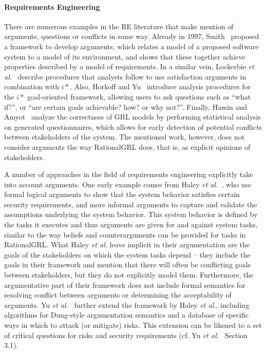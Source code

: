 \paragraph{Requirements Engineering} 
There are numerous examples in the RE literature that make mention of arguments, questions or conflicts in some way. Already in 1997, Smith~\cite{Smith:1997:CRF:2737426.2737493} proposed a framework to develop arguments, which relates a model of a proposed software system to a model of its environment, and shows that these together achieve properties described by a model of requirements. In a similar vein, Lockerbie \emph{et al.}~\cite{lockerbie2012exploring} describe procedures that analysts follow to use satisfaction arguments in combination with $i*$. Also, Horkoff and Yu~\cite{horkoff2016interactive} introduce analysis procedures for the $i*$ goal-oriented framework, allowing users to ask questions such as ``what if?'', or ``are certain goals achievable? how? or why not?''. Finally, Hassin and Amyot~\cite{hassine2016questionnaire} analyze the correctness of GRL models by performing statistical analysis on generated questionnaires, which allows for early detection of potential conflicts between stakeholders of the system. The mentioned work, however, does not consider arguments the way RationalGRL does, that is, as explicit opinions of stakeholders. 

A number of approaches in the field of requirements engineering explicitly take into account arguments. One early example comes from Haley \emph{et al.}~\cite{haley2008security}, who use formal logical arguments to show that the system behavior satisfies certain security requirements, and more informal arguments to capture and validate the assumptions underlying the system behavior. This system behavior is defined by the tasks it executes and thus arguments are given for and against system tasks, similar to the way beliefs and counterarguments can be provided for tasks in RationalGRL. What Haley \emph{et al.} leave implicit in their argumentation are the goals of the stakeholders on which the system tasks depend -- they include the goals in their framework and mention that there will often be conflicting goals between stakeholders, but they do not explicitly model them. Furthermore, the argumentative part of their framework does not include formal semantics for resolving conflict between arguments or determining the acceptability of arguments. Yu \emph{et al.}~\cite{yu2015automated} further extend the framework by Haley \emph{et al.}, including algorithms for Dung-style argumentation semantics \cite{Dung1995} and a database of specific ways in which to attack (or mitigate) risks. This extension can be likened to a set of critical questions for risks and security requirements (cf. Yu \emph{et al.}~\cite{yu2015automated} Section 3.1). 

